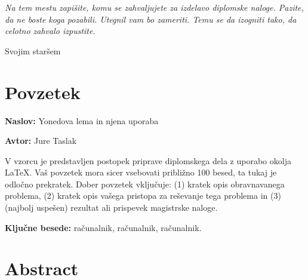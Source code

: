 \documentclass[12pt,a4paper]{book}
\newcommand{\ttitle}{Yonedova lema in njena uporaba}
\newcommand{\tauthor}{Jure Taslak}
\newcommand{\tkeywords}{računalnik, računalnik, računalnik}
\newcommand{\clearemptydoublepage}{\newpage{\pagestyle{empty}\cleardoublepage}}
\theoremstyle{definition}
\theoremstyle{plain}
\theoremstyle{definition}
\theoremstyle{remark}
\begin{document}
\vspace{2cm}

\clearemptydoublepage

\thispagestyle{empty}\mbox{}\vfill\null\it%
\noindent
Na tem mestu zapišite, komu se zahvaljujete za izdelavo diplomske naloge. Pazite, da ne boste koga pozabili. Utegnil vam bo zameriti. Temu se da izogniti tako, da celotno zahvalo izpustite.
\rm\normalfont

\clearemptydoublepage

Svojim staršem

\thispagestyle{empty}\mbox{}{\textheight}\mbox{}\hfill\begin{minipage}{0.55\textwidth}%

\normalfont\end{minipage}

\clearemptydoublepage


\pagestyle{empty}
\def\thepage{}%
\tableofcontents{}

\clearemptydoublepage


\chapter*{Povzetek}

\noindent\textbf{Naslov:} \ttitle
\bigskip

\noindent\textbf{Avtor:} \tauthor
\bigskip

\noindent V vzorcu je predstavljen postopek priprave diplomskega dela z uporabo okolja \LaTeX. Vaš povzetek mora sicer vsebovati približno 100 besed, ta tukaj je odločno prekratek.
Dober povzetek vključuje: (1) kratek opis obravnavanega problema, (2) kratek opis vašega pristopa za reševanje tega problema in (3) (najbolj uspešen) rezultat ali prispevek magistrske naloge.

\bigskip

\noindent\textbf{Ključne besede:} \tkeywords.
\clearemptydoublepage

\chapter*{Abstract}
\end{document}
